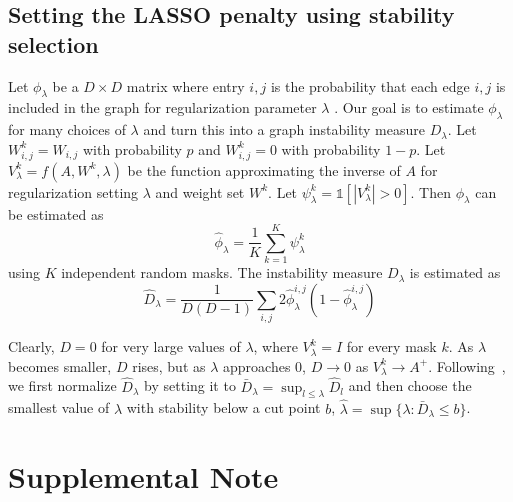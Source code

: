 \documentclass{article}
\newcommand{\beginsupplement}{%
        \setcounter{table}{0}
        \renewcommand{\thetable}{S\arabic{table}}%
        \setcounter{figure}{0}
        \renewcommand{\thefigure}{S\arabic{figure}}%
     }
\begin{document}
\subsection{Setting the LASSO penalty using stability selection}
 Let $\phi_{\lambda}$ be a $D\times D$ matrix where entry $i, j$ is the probability that each edge
$i,j$ is included in the graph for regularization parameter $\lambda$ . Our goal is to
estimate $\phi_{\lambda}$ for many choices of $\lambda$ and
turn this into a graph instability measure $D_\lambda$.
Let $W^k_{i,j} = W_{i,j}$ with probability $p$ and $W^k_{i,j} = 0$ with
probability $1-p$. Let $V_{\lambda}^k = f(A, W^k, \lambda)$  be
 the function approximating the inverse of
$A$ for regularization setting
$\lambda$ and weight set $W^k$. Let $\psi^k_{\lambda} = \mathds{1}[|V^k_{\lambda}| > 0]$.
Then  $\phi_{\lambda}$ can be estimated as
\begin{equation}
\hat{\phi}_{\lambda} = \frac{1}{K} \sum_{k=1}^K \psi^{k}_{\lambda}
\end{equation}
using $K$ independent random masks.
The instability measure $D_\lambda$ is estimated as~\cite{Liu2010}
\begin{equation}
\hat{D}_\lambda = \frac{1}{D(D-1)} \sum_{i, j} 2 \hat{\phi}^{i, j}_\lambda(1-\hat{\phi}^{i, j}_\lambda)
\end{equation}

Clearly, $D = 0$ for very large values of $\lambda$, where $V^k_\lambda = I$
for every mask $k$. As $\lambda$ becomes smaller, $D$ rises, but as $\lambda$ approaches $0$,
$D\rightarrow 0$ as $V^k_\lambda \rightarrow A^+$. Following~\cite{Liu2010},
we first normalize $\hat{D}_\lambda$ by setting it to
$\bar{D}_\lambda = \sup_{l \leq \lambda} \hat{D}_l$ and then choose the smallest
value of $\lambda$ with stability below a cut point $b$,
$\hat{\lambda} = \sup \{ \lambda : \bar{D}_\lambda \leq b \}$.


\printbibliography

\beginsupplement
\section*{Supplemental Note}
\end{document}
